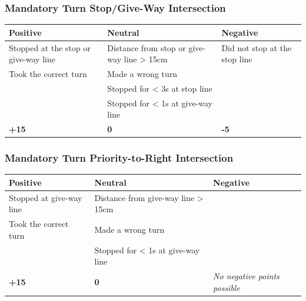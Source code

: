 \subsubsection*{Mandatory Turn Stop/Give-Way Intersection}
\begin{table}[H]
	\begin{tabularx}{\textwidth}{XXX}
		\toprule
		\textbf{Positive}                                     & \textbf{Neutral}                                            & \textbf{Negative}                              \\
		\midrule
		Stopped at the stop or give-way line \footnotemark[2] & Distance from stop or give-way line > 15cm \footnotemark[2] & Did not stop at the stop line \footnotemark[3] \\
		Took the correct turn                                 & Made a wrong turn \footnotemark[4]                          &                                                \\
		                                                      & Stopped for < 3s at stop line \footnotemark[2]              &                                                \\
		                                                      & Stopped for < 1s at give-way line \footnotemark[2]          &                                                \\
		\topstrut
		\textbf{+15}                                          & \textbf{0}                                                  & \textbf{-5}                                    \\
		\bottomrule
	\end{tabularx}
\end{table}

\subsubsection*{Mandatory Turn Priority-to-Right Intersection}
\begin{table}[H]
	\begin{tabularx}{\textwidth}{XXX}
		\toprule
		\textbf{Positive}                         & \textbf{Neutral}                                    & \textbf{Negative}                    \\
		\midrule
		Stopped at give-way line \footnotemark[2] & Distance from give-way line > 15cm \footnotemark[2] &                                      \\
		Took the correct turn                     & Made a wrong turn \footnotemark[4]                  &                                      \\
		                                          & Stopped for < 1s at give-way line \footnotemark[2]  &                                      \\
		\topstrut
		\textbf{+15}                              & \textbf{0}                                          & \textit{No negative points possible} \\
		\bottomrule
	\end{tabularx}
\end{table}


